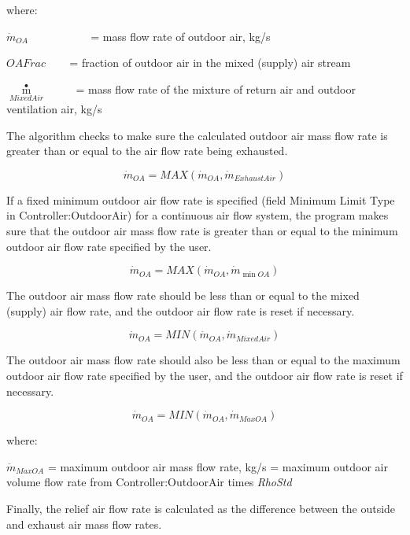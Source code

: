 where:

\({\dot m_{OA}}\) ~~~~~~~~~~ = mass flow rate of outdoor air, kg/s

\(OAFrac\) ~~~ = fraction of outdoor air in the mixed (supply) air stream

\({\mathop m\limits^ \bullet_{MixedAir}}\) ~~~~ = mass flow rate of the mixture of return air and outdoor ventilation air, kg/s

The algorithm checks to make sure the calculated outdoor air mass flow rate is greater than or equal to the air flow rate being exhausted.

\begin{equation}
{\dot m_{OA}} = MAX\left( {{{\dot m}_{OA}},{{\dot m}_{ExhaustAir}}} \right)
\end{equation}

If a fixed minimum outdoor air flow rate is specified (field Minimum Limit Type in Controller:OutdoorAir) for a continuous air flow system, the program makes sure that the outdoor air mass flow rate is greater than or equal to the minimum outdoor air flow rate specified by the user.

\begin{equation}
{\dot m_{OA}} = MAX\left( {{{\dot m}_{OA}},{{\dot m}_{\min OA}}} \right)
\end{equation}

The outdoor air mass flow rate should be less than or equal to the mixed (supply) air flow rate, and the outdoor air flow rate is reset if necessary.

\begin{equation}
{\dot m_{OA}} = MIN\left( {{{\dot m}_{OA}},{{\dot m}_{MixedAir}}} \right)
\end{equation}

The outdoor air mass flow rate should also be less than or equal to the maximum outdoor air flow rate specified by the user, and the outdoor air flow rate is reset if necessary.

\begin{equation}
{\dot m_{OA}} = MIN\left( {{{\dot m}_{OA}},{{\dot m}_{MaxOA}}} \right)
\end{equation}

where:

\({\dot m_{MaxOA}}\) = maximum outdoor air mass flow rate, kg/s = maximum outdoor air volume flow rate from Controller:OutdoorAir times \emph{RhoStd}

Finally, the relief air flow rate is calculated as the difference between the outside and exhaust air mass flow rates.


